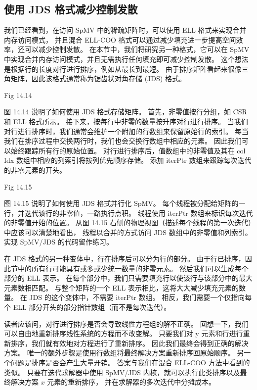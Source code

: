 \subsection{使用 JDS 格式减少控制发散}
我们已经看到，在访问 SpMV 中的稀疏矩阵时，可以使用 ELL 格式来实现合并内存访问模式，
并且混合 ELL-COO 格式可以通过减少填充进一步提高空间效率，还可以减少控制发散。 
在本节中，我们将研究另一种格式，它可以在 SpMV 中实现合并内存访问模式，并且无需执行任何填充即可减少控制发散。 
这个想法是根据行的长度对行进行排序，例如从最长到最短。 
由于排序矩阵看起来很像三角矩阵，因此该格式通常称为锯齿状对角存储 (JDS) 格式。

{\color{red} Fig 14.14}

图 14.14 说明了如何使用 JDS 格式存储矩阵。 首先，非零值按行分组，如 CSR 和 ELL 格式所示。 
接下来，按每行中非零的数量按升序对行进行排序。 当我们对行进行排序时，我们通常会维护一个附加的行数组来保留原始行的索引。 
每当我们在排序过程中交换两行时，我们也会交换行数组中相应的元素。 因此我们可以始终跟踪所有行的原始位置。 
对行进行排序后，值数组中的非零值及其在 col Idx 数组中相应的列索引将按列优先顺序存储。 
添加 iterPtr 数组来跟踪每次迭代的非零元素的开头。

{\color{red} Fig 14.15}

图 14.15 说明了如何使用 JDS 格式并行化 SpMV。 每个线程被分配给矩阵的一行，并迭代该行的非零值，一路执行点积。 
线程使用 iterPtr 数组来标识每次迭代的非零值开始的位置。 
从图 14.15 右侧的物理视图（描述每个线程的第一次迭代）中应该可以清楚地看出，
线程以合并的方式访问 JDS 数组中的非零值和列索引。 实现 SpMV/JDS 的代码留作练习。

在 JDS 格式的另一种变体中，行在排序后可以分为行的部分。 
由于行已排序，因此节中的所有行可能具有或多或少统一数量的非零元素。 然后我们可以生成每个部分的 ELL 表示。 
在每个部分中，我们只需要填充行以使该行与该部分中的最大元素数相匹配。 
与整个矩阵的一个 ELL 表示相比，这将大大减少填充元素的数量。 在 JDS 的这个变体中，不需要 iterPtr 数组。 
相反，我们需要一个仅指向每个 ELL 部分开头的部分指针数组（而不是每次迭代）。

读者应该问，对行进行排序是否会导致线性方程组的解不正确。 回想一下，我们可以自由地重新排序线性系统的方程而不改变解。 
只要我们对 y 元素和行进行重新排序，我们就有效地对方程进行了重新排序。 因此我们最终会得到正确的解决方案。 
唯一的额外步骤是使用行数组将最终解决方案重新排序回原始顺序。 另一个问题是排序是否会产生大量开销。 
答案与我们在混合 ELL-COO 方法中看到的类似。 
只要在迭代求解器中使用 SpMV/JDS 内核，就可以执行此类排序以及最终解决方案 $x$ 元素的重新排序，
并在求解器的多次迭代中分摊成本。

